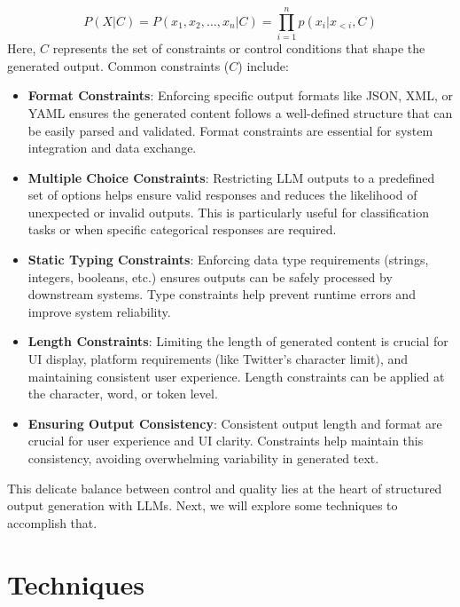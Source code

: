 \begin{equation}
P(X|C) = P(x_1, x_2, \ldots, x_n|C) = \prod_{i=1}^n p(x_i|x_{<i}, C)
\end{equation}
Here, $C$ represents the set of constraints or control conditions that shape the generated output. Common constraints ($C$) include:

\begin{itemize}
    \item \textbf{Format Constraints}: Enforcing specific output formats like JSON, XML, or YAML ensures the generated content follows a well-defined structure that can be easily parsed and validated. Format constraints are essential for system integration and data exchange.
    
    \item \textbf{Multiple Choice Constraints}: Restricting LLM outputs to a predefined set of options helps ensure valid responses and reduces the likelihood of unexpected or invalid outputs. This is particularly useful for classification tasks or when specific categorical responses are required.
    
    \item \textbf{Static Typing Constraints}: Enforcing data type requirements (strings, integers, booleans, etc.) ensures outputs can be safely processed by downstream systems. Type constraints help prevent runtime errors and improve system reliability.
    
    \item \textbf{Length Constraints}: Limiting the length of generated content is crucial for UI display, platform requirements (like Twitter's character limit), and maintaining consistent user experience. Length constraints can be applied at the character, word, or token level.
    
    \item \textbf{Ensuring Output Consistency}: Consistent output length and format are crucial for user experience and UI clarity. Constraints help maintain this consistency, avoiding overwhelming variability in generated text.
\end{itemize}

This delicate balance between control and quality lies at the heart of structured output generation with LLMs. Next, we will explore some techniques to accomplish that.
\section{Techniques}

